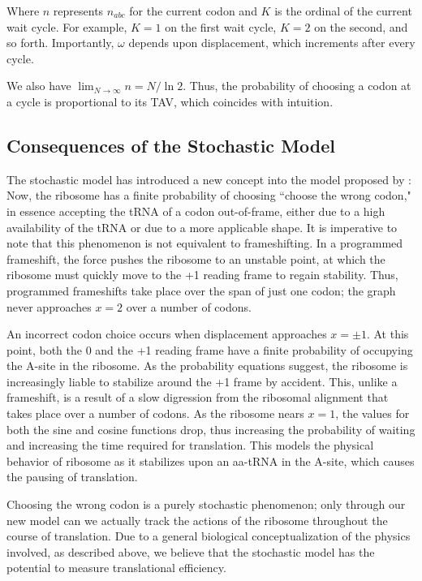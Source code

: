 \documentclass[12pt]{article}
\numberwithin{equation}{section}
\begin{document}
Where $n$ represents $n_{abc}$ for the current codon and $K$ is the
ordinal of the current wait cycle. For example, $K=1$ on the first
wait cycle, $K=2$ on the second, and so forth.  Importantly, $\omega$
depends upon displacement, which increments after every cycle.

We also have $\displaystyle\lim_{N\rightarrow\infty} n = N/\ln{2}$. Thus,
the probability of choosing a codon at a cycle is proportional
to its TAV, which coincides with intuition.

\subsection{Consequences of the Stochastic Model}

The stochastic model has introduced a new concept into the model proposed by
\citet{lalit:mechanics}: Now, the ribosome has a finite probability of
choosing ``choose the wrong codon," in 
essence accepting the tRNA of a codon out-of-frame, either due to a high availability
of the tRNA or due to a more applicable shape.  It is imperative to note
that this phenomenon is not equivalent to frameshifting.  In a programmed
frameshift, the force pushes the ribosome to an unstable point, at which
the ribosome must quickly move to the +1 reading frame to regain stability.
Thus, programmed frameshifts take place over the span of just
one codon; the graph never approaches $x=2$ over a number of codons.

An incorrect codon choice occurs when displacement approaches $x = \pm 1$.
At this point, both the 0 and the +1 reading frame have a finite
probability of occupying the A-site in the ribosome. As the probability
equations suggest, the ribosome is increasingly liable to stabilize around
the +1 frame by accident.  This, unlike a frameshift, is a result
of a slow digression from the ribosomal alignment that takes place over a number of codons.
As the ribosome nears $x = 1$, the values for both the sine 
and cosine functions drop, thus increasing the probability of waiting and 
increasing the time required for translation. This models the physical
behavior of ribosome as it stabilizes upon an aa-tRNA in the A-site,
which causes the pausing of translation.

Choosing the wrong codon is a purely stochastic phenomenon; only through our new
model can we actually track the actions of the ribosome throughout the course
of translation.  Due to a general biological conceptualization of the physics involved,
as described above, we believe that the stochastic model has the potential to 
measure translational efficiency.
\end{document}
